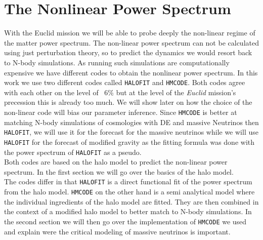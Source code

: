 \documentclass[oneside]{book}
\newcommand*{\Euclid}{\textit{Euclid}\xspace}
\newcommand*{\halofit}{\texttt{HALOFIT}\xspace}
\newcommand*{\hmcode}{\texttt{HMCODE}\xspace}
\begin{document}
 \chapter{The Nonlinear Power Spectrum}
With the Euclid mission we will be able to probe deeply the non-linear regime of the matter power spectrum. The non-linear power spectrum can not be calculated using just perturbation theory, so to predict the dynamics we would resort back to N-body simulations. As running such simulations are computationally expensive we have different codes to obtain the nonlinear power spectrum. In this work we use two different codes called \halofit and \hmcode. Both codes agree with each other on the level of ~6\% but at the level of the \Euclid mission's precession this is already too much. We will show later on how the choice of the non-linear code will bias our parameter inference. Since \hmcode is better at matching N-body simulations of cosmologies with DE and massive Neutrinos then \halofit, we will use it for the forecast for the massive neutrinos while we will use \halofit for the forecast of modified gravity as the fitting formula was done with the power spectrum of \halofit as a pseudo.\\
 Both codes are based on the halo model to predict the non-linear power spectrum. In the first section we will go over the basics of the halo model.\\
The codes differ in that \halofit is a direct functional fit of the power spectrum from the halo model. \hmcode on the other hand is a semi analytical model where the individual ingredients of the halo model are fitted. They are then combined in the context of a modified halo model to better match to N-body simulations. In the second section we will then go over the implementation of \hmcode we used and explain were the critical modeling of massive neutrinos is important.\\
\end{document}
